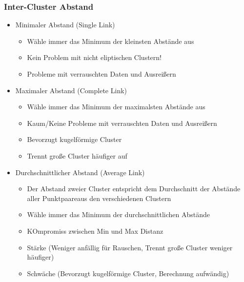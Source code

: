 \documentclass[a4paper]{article}
\begin{document}
\begin{landscape}
\begin{multicols}{3}
    \subsubsection{Inter-Cluster Abstand}
    \begin{itemize}[noitemsep,nolistsep]
        \item Minimaler Abstand (Single Link)
        \begin{itemize}[noitemsep,nolistsep]
            \item Wähle immer das Minimum der kleinsten Abstände aus
            \item Kein Problem mit nicht eliptischen Clustern!
            \item Probleme mit verrauschten Daten und Ausreißern
        \end{itemize}
        \item Maximaler Abstand (Complete Link)
        \begin{itemize}[noitemsep,nolistsep]
            \item Wähle immer das Minimum der maximalsten Abstände aus
            \item Kaum/Keine Probleme mit verrauschten Daten und Ausreißern
            \item Bevorzugt kugelförmige Cluster
            \item Trennt große Cluster häufiger auf
        \end{itemize}
        \item Durchschnittlicher Abstand (Average Link)
        \begin{itemize}[noitemsep,nolistsep]
            \item Der Abstand zweier Cluster entspricht dem Durchschnitt der Abstände aller Punktpaareaus den verschiedenen Clustern
            \item Wähle immer das Minimum der durchschnittlichen Abstände
            \item KOmpromiss zwischen Min und Max Distanz
            \item Stärke (Weniger anfällig für Rauschen, Trennt große Cluster weniger häufiger)
            \item Schwäche (Bevorzugt kugelförmige Cluster, Berechnung aufwändig)
        \end{itemize}
    \end{itemize}


    



    \end{multicols}
    \end{landscape}
\end{document}
